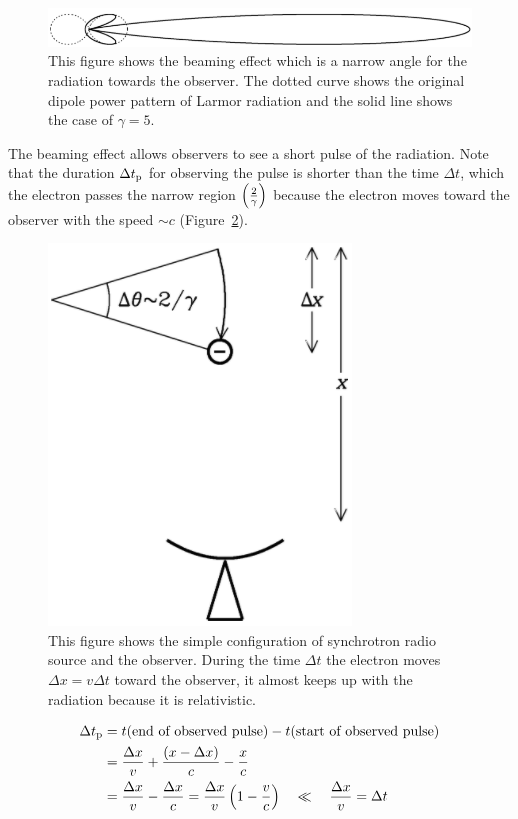 \begin{figure}[htbp]
	\centering
	\includegraphics[width=.7\linewidth]{Chapter_2/Figures/NRAO_radio5n3.png}
    \caption[The schematic picture of relativistic aberration]{\label{fig:nrao_radio5n3}
        This figure shows the beaming effect which is a narrow angle for the radiation towards the observer.
        The dotted curve shows the original dipole power pattern of Larmor radiation and the solid line shows the case of $\gamma = 5$.
    }
\end{figure}

The beaming effect allows observers to see a short pulse of the radiation.
Note that the duration $\Delta t_{\mathrm{p}}$ for observing the pulse is shorter than the time $\Delta t$, which the electron passes the narrow region $\left(\frac{2}{\gamma}\right)$ because the electron moves toward the observer with the speed $\sim c$ (Figure~\ref{fig:nrao_radio5n4}).

\begin{figure}[htbp]
	\centering
	\includegraphics[width=.3\linewidth]{Chapter_2/Figures/NRAO_radio5n4.png}
    \caption[Simple condiguration of the synchrotron source and observer]{\label{fig:nrao_radio5n4}
        This figure shows the simple configuration of synchrotron radio source and the observer.
        During the time $\Delta t$ the electron moves $\Delta x = v\Delta t$ toward the observer, it almost keeps up with the radiation because it is relativistic.
    }
\end{figure}

\begin{equation}\label{eq:essential_radio5n54}
    \begin{aligned}
        \Delta t_{\mathrm{p}} &=t(\text{end of observed pulse})-t(\text{start of observed pulse}) \\
                              &=\frac{\Delta x}{v}+\frac{(x-\Delta x)}{c}-\frac{x}{c} \\
                              &= \frac{\Delta x}{v}-\frac{\Delta x}{c}=\frac{\Delta x}{v}\left(1-\frac{v}{c}\right) \quad \ll \quad \frac{\Delta x}{v}=\Delta t
    \end{aligned}
\end{equation}

